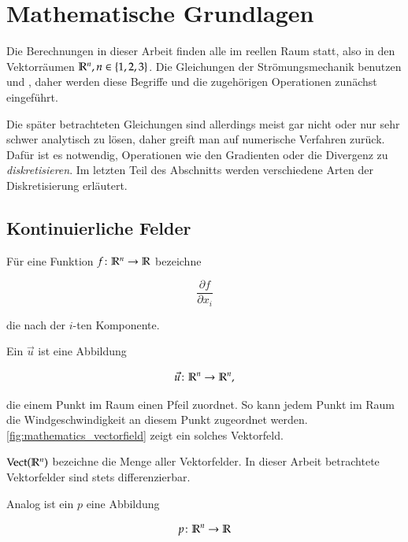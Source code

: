 \section{Mathematische Grundlagen}
\label{sec:mathematics}

Die Berechnungen in dieser Arbeit finden alle im reellen Raum statt, also in den
Vektorräumen $\mathbb{R}^n, n \in \{1,2,3\}$. Die Gleichungen der
Strömungsmechanik benutzen  und
, daher werden diese Begriffe und die zugehörigen
Operationen zunächst eingeführt.

Die später betrachteten Gleichungen sind allerdings meist gar nicht oder nur sehr
schwer analytisch zu lösen, daher greift man auf numerische Verfahren zurück.
Dafür ist es notwendig, Operationen wie den Gradienten oder die
Divergenz zu \emph{diskretisieren}. Im letzten Teil des Abschnitts
werden verschiedene Arten der Diskretisierung erläutert.

\subsection{Kontinuierliche Felder}

Für eine Funktion $f \colon \mathbb{R}^n \to \mathbb{R}$ bezeichne

\begin{equation}
\frac{\partial f}{\partial x_i}
\end{equation}

die  nach der $i$-ten Komponente.

Ein  $\vec{u}$ ist eine Abbildung

\begin{equation*}
\vec{u} \colon \mathbb{R}^n \to \mathbb{R}^n,
\end{equation*}

die einem Punkt im Raum einen Pfeil zuordnet. So kann \PimiddyzB{}jedem
Punkt im Raum die Windgeschwindigkeit an diesem Punkt zugeordnet
werden. \autoref{fig:mathematics_vectorfield} zeigt ein solches
Vektorfeld.

$\operatorname*{Vect}(\mathbb{R}^n)$ bezeichne die Menge aller
Vektorfelder. In dieser Arbeit betrachtete Vektorfelder sind stets
differenzierbar.

Analog ist ein  $p$ eine Abbildung

\begin{equation*}
p \colon \mathbb{R}^n \to \mathbb{R}
\end{equation*}

